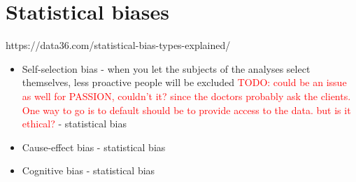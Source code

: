 \documentclass[12pt, a4paper, oneside]{book}   	%
\renewcommand{\todo}[1]{\textcolor{red}{TODO: #1}}
\begin{document}
		\section{Statistical biases}
			https://data36.com/statistical-bias-types-explained/
			\begin{itemize}
				\item Self-selection bias - when you let the subjects of the analyses select themselves, less proactive people will be excluded \todo{could be an issue as well for PASSION, couldn't it? since the doctors probably ask the clients. One way to go is to default should be to provide access to the data. but is it ethical?} \autocites{Mester_2022}{Mester_2017}- statistical bias
				\item Cause-effect bias \autocites{Mester_2022}{Mester_2017} - statistical bias
				\item Cognitive bias \autocites{Mester_2022}{Mester_2017} - statistical bias
			\end{itemize}	
	
\end{document}
